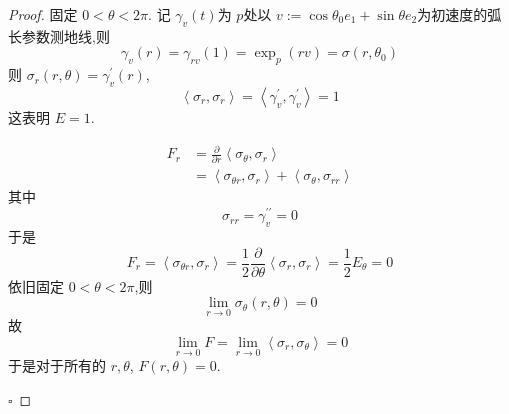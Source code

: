 \documentclass[../../main.tex]{subfiles}
\begin{document}
\begin{proof}
    固定 \(  0<  \theta  < 2\pi   \). 记 \(   \gamma _{v}\left( t \right)   \)为 \(  p  \)处以 \(  v := \cos  \theta_0e_1+ \sin  \theta e_2 \)为初速度的弧长参数测地线,则 \[
     \gamma _{v}\left( r \right)=  \gamma _{rv}\left( 1 \right)= \exp _{p}\left( rv \right)=  \sigma \left( r, \theta_0 \right)   
    \]   则 \(   \sigma _{r}\left( r, \theta   \right)=  \gamma ^{\prime} _{v}\left( r \right)    \),\[
    \left< \sigma _{r}, \sigma _{r} \right>= \left< \gamma _{v}^{\prime} , \gamma _{v}^{\prime}  \right>= 1
    \]这表明 \(  E= 1  \).
    
    \[
   \begin{aligned}
    F_{r}&=  \frac{\partial }{\partial r}\left< \sigma _{ \theta }, \sigma _{r} \right>\\ 
     &=  \left< \sigma _{ \theta r}, \sigma _{r} \right>+ \left< \sigma _{ \theta }, \sigma _{rr} \right>
   \end{aligned}
    \]其中 \[
     \sigma _{rr}=  \gamma _{v}^{\prime \prime} = 0
    \]于是 \[
    F_{r}= \left< \sigma _{ \theta r}, \sigma _{r} \right>= \frac{1 }{2 }\frac{\partial }{\partial  \theta }\left<  \sigma _{r}, \sigma _{r}\right>= \frac{1}{2}E_{ \theta }= 0
    \]依旧固定 \(  0<  \theta < 2\pi   \),则  \[
    \lim_{r\to 0} \sigma _{ \theta }\left( r, \theta  \right) = 0
    \]故 \[
    \lim_{r\to 0}F=  \lim_{r\to 0}\left< \sigma _{r}, \sigma _{ \theta }  \right>= 0 
    \]于是对于所有的 \(  r, \theta   \), \(  F\left( r, \theta  \right)= 0   \).  

    \hfill $\square$
\end{proof}
\end{document}
